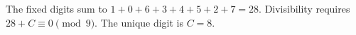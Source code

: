 The fixed digits sum to $1+0+6+3+4+5+2+7=28$. Divisibility requires $28+C\equiv0\pmod9$. The unique digit is $\boxed{C=8}$.
